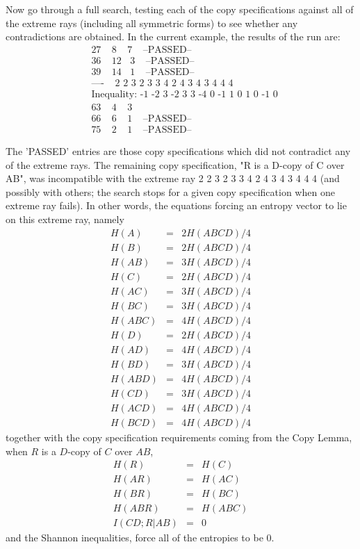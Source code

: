\documentclass[10pt,journal]{IEEEtran}
\begin{document}
Now go through a full search, testing each of the copy specifications against
all of the extreme rays (including all symmetric forms) to see whether any
contradictions are obtained.  In the current example, the results of the run are:
\begin{align*}
&27   \ \ \ \ \  8  \ \ \ \ \ 7    \ \ \ \ \ \text{--PASSED--}     \\
&36   \ \ \ \ \ 12   \ \ \ \ 3  \ \ \ \ \ \text{--PASSED--}     \\
       &39   \ \ \ \ \ 14   \ \ \ \ 1  \ \ \ \ \ \text{--PASSED--}     \\
 &\text{----} \ \ \ \ \ \text{2 2 3 2 3 3 4 2 4 3 4 3 4 4 4}\\
&\text{Inequality: -1  -2   3  -2   3   3  -4   0  -1   1   0   1   0  -1   0}  \\
        &63   \ \ \ \ \  4  \ \ \ \ \ 3        \\
               &66   \ \ \ \ \  6  \ \ \ \ \ 1  \ \ \ \ \ \text{--PASSED--}        \\
       &75   \ \ \ \ \  2  \ \ \ \ \ 1  \ \ \ \ \ \text{--PASSED--}
\end{align*}

The 'PASSED' entries are those copy specifications which did not contradict
any of the extreme rays.  The remaining copy specification,
"R is a D-copy of C over AB", was incompatible with the extreme
ray 2 2 3 2 3 3 4 2 4 3 4 3 4 4 4 (and possibly with others; the search
stops for a given copy specification when one extreme ray fails).
In other words, the equations forcing an entropy vector to lie on this
extreme ray, namely
\begin{eqnarray}
 \label{eq_A}     H(A) &=& 2H(ABCD)/4\\
 \label{eq_B}       H(B) &=& 2H(ABCD)/4\\
     H(AB) &=& 3H(ABCD)/4\\
      H(C) &=& 2H(ABCD)/4\\
     H(AC) &=& 3H(ABCD)/4\\
     H(BC) &=& 3H(ABCD)/4\\
    H(ABC) &=& 4H(ABCD)/4\\
\label{eq_D}      H(D) &=& 2H(ABCD)/4\\
     H(AD) &=& 4H(ABCD)/4\\
     H(BD) &=& 3H(ABCD)/4\\
\label{eq_ABD}     H(ABD) &=& 4H(ABCD)/4\\
     H(CD) &=& 3H(ABCD)/4\\
\label{eq_ACD}    H(ACD) &=& 4H(ABCD)/4\\
    H(BCD) &=& 4H(ABCD)/4
\end{eqnarray}
together with the copy specification requirements coming from the Copy Lemma, when
$R$ is a $D$-copy of $C$ over $AB$,
\begin{eqnarray}
       H(R) &=& H(C)\\
      H(AR) &=& H(AC)\\
      H(BR) &=& H(BC)\\
     H(ABR) &=& H(ABC)\\
 \label{eq_CDR}      I(CD;R|AB) &=& 0
\end{eqnarray}
and the Shannon inequalities, force all of the entropies to be 0.
\end{document}
